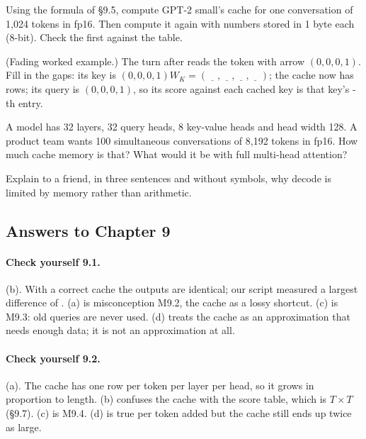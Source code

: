 \begin{exercise}
Using the formula of \S9.5, compute GPT-2 small's cache for one conversation of 1{,}024 tokens in fp16.
Then compute it again with numbers stored in 1 byte each (8-bit). Check the first against the table.
\end{exercise}

\begin{exercise}
(Fading worked example.) The turn after  reads the token \tok{,} with arrow $(0,0,0,1)$. Fill in the
gaps: its key is $(0,0,0,1)W_K = (\underline{\quad},\underline{\quad},\underline{\quad},\underline{\quad})$;
the cache now has \underline{\quad} rows; its query is $(0,0,0,1)$, so its score against each cached key is
that key's \underline{\quad}-th entry.
\end{exercise}

\begin{exercise}
A model has 32 layers, 32 query heads, 8 key-value heads and head width 128. A product team wants 100
simultaneous conversations of 8{,}192 tokens in fp16. How much cache memory is that? What would it be with
full multi-head attention?
\end{exercise}

\begin{exercise}
Explain to a friend, in three sentences and without symbols, why decode is limited by memory rather than
arithmetic.
\end{exercise}

\subsection*{Answers to Chapter 9}

\paragraph{Check yourself 9.1.} (b). With a correct cache the outputs are identical; our script measured a
largest difference of \nNineMaxDiff. (a) is misconception M9.2, the cache as a lossy shortcut. (c) is M9.3: old
queries are never used. (d) treats the cache as an approximation that needs enough data; it is not an
approximation at all.

\paragraph{Check yourself 9.2.} (a). The cache has one row per token per layer per head, so it grows in
proportion to length. (b) confuses the cache with the score table, which is $T\times T$ (\S9.7). (c) is
M9.4. (d) is true per token added but the cache still ends up twice as large.

